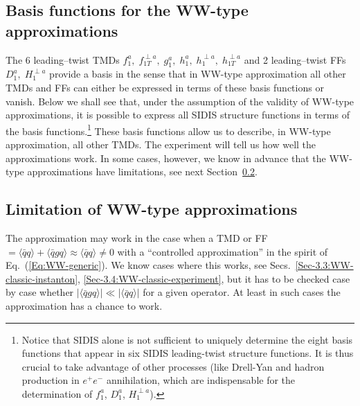 \documentclass[a4paper,11pt]{article}
\newcommand{\la}{\langle}
\newcommand{\ra}{\rangle}
\begin{document}
\subsection{Basis functions for the WW-type approximations}
\label{Sec-3.7:basis}

The 6 leading--twist TMDs
$f_1^a, \; f_{1T}^{\perp a}, \; g_1^a, \; h_1^a, \;h_1^{\perp a},\; h_{1T}^{\perp a}$
and 2 leading--twist FFs $D_1^a, \; H_1^{\perp a}$ provide a basis
in the sense that in WW-type approximation all other TMDs and FFs
can either be expressed in terms of these basis functions or vanish.
Below we shall see that, under the assumption of the validity of WW-type
approximations, it is possible to express all SIDIS structure functions
in terms of the basis functions.\footnote{%
   Notice that SIDIS alone is not sufficient to uniquely determine
   the eight basis functions that appear in six SIDIS
   leading-twist structure functions. It is thus crucial to take
   advantage of other processes (like Drell-Yan and hadron production in
   $e^+e^-$ annihilation, which are indispensable for the determination
   of $f_1^a$, $D_1^a$, $H_1^{\perp a}$).}
These basis functions allow us to describe, in WW-type approximation,
all other TMDs. The experiment will tell us how well the approximations work.
In some cases, however, we know in advance that the WW-type approximations
have limitations, see next Section~\ref{Sec-3.8:limitations}.

\subsection{Limitation of WW-type approximations}
\label{Sec-3.8:limitations}

The approximation may work in the case when a TMD or FF
$=\la\bar{q}q\ra + \la\bar{q}gq\ra \approx \la\bar{q}q\ra \neq 0$ with
a ``controlled approximation'' in the spirit of Eq.~(\ref{Eq:WW-generic}).
We know cases where this works, see
Secs.~\ref{Sec-3.3:WW-classic-instanton}, \ref{Sec-3.4:WW-classic-experiment},
but it has to be checked case by case whether
$| \la\bar{q}gq\ra  | \ll  |\la\bar{q}q\ra|$ for a given operator.
At least in such cases the approximation has a chance to work.
\end{document}
